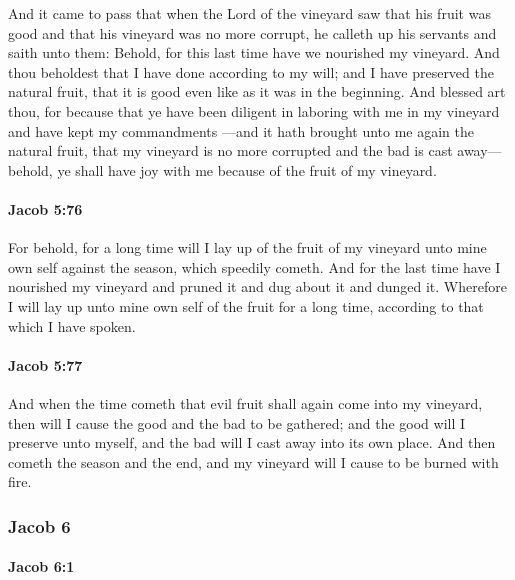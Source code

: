 			And it came to pass that when the Lord of the vineyard saw
			that his fruit was good and that his vineyard was no more corrupt,
			he calleth up his servants and saith unto them:
			Behold, for this last time have we nourished my vineyard.
			And thou beholdest that I have done according to my will;
			and I have preserved the natural fruit,
			that it is good even like as it was in the beginning.
			And blessed art thou,
			for because that ye have been diligent in laboring with me in my vineyard
			and have kept my commandments
			---and it hath brought unto me again the natural fruit,
			that my vineyard is no more corrupted and the bad is cast away---
			behold, ye shall have joy with me because of the fruit of my vineyard.

		\paragraph{Jacob 5:76} %
			\label{JACOB-5-76}

			For behold, for a long time will I lay up of the fruit of my vineyard
			unto mine own self against the season, which speedily cometh.
			And for the last time have I nourished my vineyard
			and pruned it and dug about it and dunged it.
			Wherefore I will lay up unto mine own self of the fruit for a long time,
			according to that which I have spoken.

		\paragraph{Jacob 5:77} %
			\label{JACOB-5-77}

			And when the time cometh that evil fruit shall again come into my vineyard,
			then will I cause the good and the bad to be gathered;
			and the good will I preserve unto myself,
			and the bad will I cast away into its own place.
			And then cometh the season and the end,
			and my vineyard will I cause to be burned with fire.

	\subsubsection{Jacob 6} %
		\label{JACOB-6}
		
		\paragraph{Jacob 6:1} %
			\label{JACOB-6-1}

